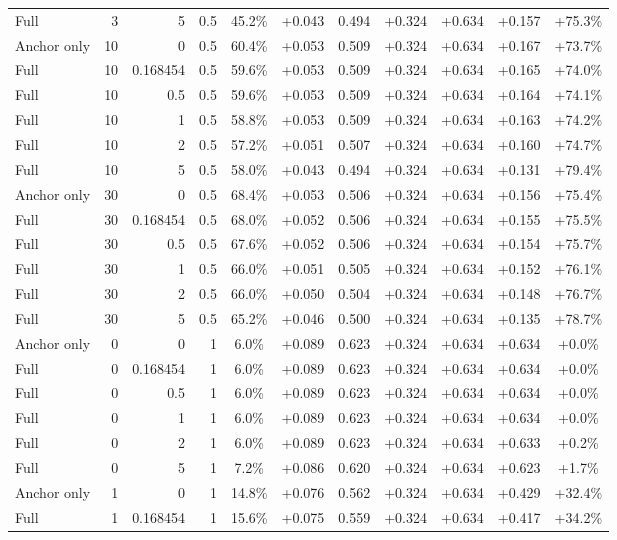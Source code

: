 \begin{table}[htbp]
\begin{tabular}{lrrrccccccc}
Full & 3 & 5 & 0.5 & 45.2\% & +0.043 & 0.494 & +0.324 & +0.634 & +0.157 & +75.3\% \\
Anchor only & 10 & 0 & 0.5 & 60.4\% & +0.053 & 0.509 & +0.324 & +0.634 & +0.167 & +73.7\% \\
Full & 10 & 0.168454 & 0.5 & 59.6\% & +0.053 & 0.509 & +0.324 & +0.634 & +0.165 & +74.0\% \\
Full & 10 & 0.5 & 0.5 & 59.6\% & +0.053 & 0.509 & +0.324 & +0.634 & +0.164 & +74.1\% \\
Full & 10 & 1 & 0.5 & 58.8\% & +0.053 & 0.509 & +0.324 & +0.634 & +0.163 & +74.2\% \\
Full & 10 & 2 & 0.5 & 57.2\% & +0.051 & 0.507 & +0.324 & +0.634 & +0.160 & +74.7\% \\
Full & 10 & 5 & 0.5 & 58.0\% & +0.043 & 0.494 & +0.324 & +0.634 & +0.131 & +79.4\% \\
Anchor only & 30 & 0 & 0.5 & 68.4\% & +0.053 & 0.506 & +0.324 & +0.634 & +0.156 & +75.4\% \\
Full & 30 & 0.168454 & 0.5 & 68.0\% & +0.052 & 0.506 & +0.324 & +0.634 & +0.155 & +75.5\% \\
Full & 30 & 0.5 & 0.5 & 67.6\% & +0.052 & 0.506 & +0.324 & +0.634 & +0.154 & +75.7\% \\
Full & 30 & 1 & 0.5 & 66.0\% & +0.051 & 0.505 & +0.324 & +0.634 & +0.152 & +76.1\% \\
Full & 30 & 2 & 0.5 & 66.0\% & +0.050 & 0.504 & +0.324 & +0.634 & +0.148 & +76.7\% \\
Full & 30 & 5 & 0.5 & 65.2\% & +0.046 & 0.500 & +0.324 & +0.634 & +0.135 & +78.7\% \\
Anchor only & 0 & 0 & 1 & 6.0\% & +0.089 & 0.623 & +0.324 & +0.634 & +0.634 & +0.0\% \\
Full & 0 & 0.168454 & 1 & 6.0\% & +0.089 & 0.623 & +0.324 & +0.634 & +0.634 & +0.0\% \\
Full & 0 & 0.5 & 1 & 6.0\% & +0.089 & 0.623 & +0.324 & +0.634 & +0.634 & +0.0\% \\
Full & 0 & 1 & 1 & 6.0\% & +0.089 & 0.623 & +0.324 & +0.634 & +0.634 & +0.0\% \\
Full & 0 & 2 & 1 & 6.0\% & +0.089 & 0.623 & +0.324 & +0.634 & +0.633 & +0.2\% \\
Full & 0 & 5 & 1 & 7.2\% & +0.086 & 0.620 & +0.324 & +0.634 & +0.623 & +1.7\% \\
Anchor only & 1 & 0 & 1 & 14.8\% & +0.076 & 0.562 & +0.324 & +0.634 & +0.429 & +32.4\% \\
Full & 1 & 0.168454 & 1 & 15.6\% & +0.075 & 0.559 & +0.324 & +0.634 & +0.417 & +34.2\% \\

\end{tabular}
\end{table}
